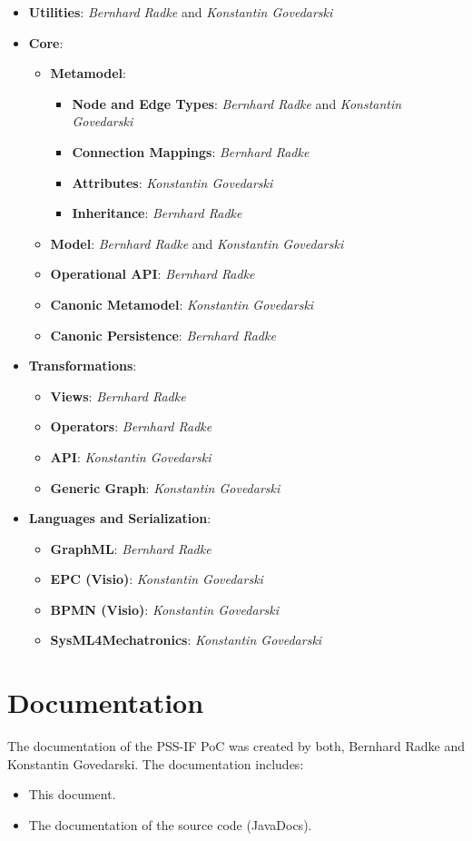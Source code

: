 \begin{itemize}
\item \textbf{Utilities}: \textit{Bernhard Radke} and \textit{Konstantin Govedarski}
\item \textbf{Core}:
	\begin{itemize}
	\item \textbf{Metamodel}:
		\begin{itemize}
		\item \textbf{Node and Edge Types}: \textit{Bernhard Radke} and \textit{Konstantin Govedarski}
		\item \textbf{Connection Mappings}: \textit{Bernhard Radke}
		\item \textbf{Attributes}: \textit{Konstantin Govedarski}
		\item \textbf{Inheritance}: \textit{Bernhard Radke}
		\end{itemize}
	\item \textbf{Model}: \textit{Bernhard Radke} and \textit{Konstantin Govedarski}
	\item \textbf{Operational API}: \textit{Bernhard Radke}
	\item \textbf{Canonic Metamodel}: \textit{Konstantin Govedarski}
	\item \textbf{Canonic Persistence}: \textit{Bernhard Radke}
 	\end{itemize}
\item \textbf{Transformations}:
	\begin{itemize}
	\item \textbf{Views}: \textit{Bernhard Radke}
	\item \textbf{Operators}: \textit{Bernhard Radke}
	\item \textbf{API}: \textit{Konstantin Govedarski}
	\item \textbf{Generic Graph}: \textit{Konstantin Govedarski}
	\end{itemize}
\item \textbf{Languages and Serialization}:
	\begin{itemize}
	\item \textbf{GraphML}: \textit{Bernhard Radke}
	\item \textbf{EPC (Visio)}: \textit{Konstantin Govedarski}
	\item \textbf{BPMN (Visio)}: \textit{Konstantin Govedarski}
	\item \textbf{SysML4Mechatronics}: \textit{Konstantin Govedarski}
	\end{itemize}
\end{itemize}

\section*{Documentation}

The documentation of the PSS-IF PoC was created by both, Bernhard Radke and Konstantin Govedarski. The documentation includes:

\begin{itemize}
\item This document.
\item The documentation of the source code (JavaDocs).
\end{itemize}